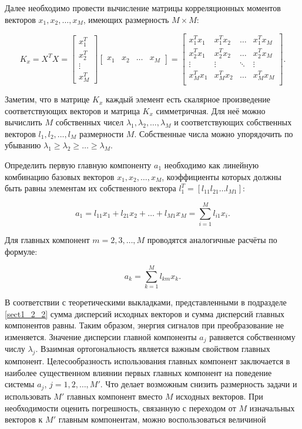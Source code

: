 Далее необходимо провести вычисление матрицы корреляционных моментов векторов $x_1, x_2, \dots, x_M$, имеющих размерность $M \times M$:

\begin{equation} \label{eq:2_3_1_3}
K_x = X^T X =
\begin{bmatrix} x_1^T \\ x_2^T \\ \vdots \\ x_M^T \end{bmatrix} \begin{bmatrix} x_1 & x_2 & \dots & x_M \end{bmatrix} = 
\begin{bmatrix}
x_1^T x_1 & x_1^T x_2 & \dots  & x_1^T x_M \\
x_2^T x_1 & x_2^T x_2 & \dots  & x_2^T x_M \\
\vdots    & \vdots    & \ddots & \vdots    \\
x_M^T x_1 & x_M^T x_2 & \dots  & x_M^T x_M \\
\end{bmatrix}.
\end{equation}

Заметим, что в матрице $K_x$ каждый элемент есть скалярное произведение соответствующих векторов и матрица $K_x$ симметричная.
Для неё можно вычислить $M$ собственных чисел $\lambda_1, \lambda_2, \dots, \lambda_M$ и соответствующих собственных векторов $l_1, l_2, \dots, l_M$ размерности $M$.
Собственные числа можно упорядочить по убыванию $\lambda_1 \ge \lambda_2 \ge \dots \ge \lambda_M$.

Определить первую главную компоненту $a_1$ необходимо как линейную комбинацию базовых векторов $x_1, x_2, \dots, x_M$, коэффициенты которых должны быть равны элементам их собственного вектора $l_1^T= [l_{11} l_{21} \dots l_{M1}]$:

\begin{equation} \label{eq:2_3_1_4}
a_1 = l_{11} x_1 + l_{21} x_2 + \dots + l_{M1} x_M = \sum_{i=1}^M l_{i1} x_i.
\end{equation}

Для главных компонент $m = 2, 3, \dots, M$ проводятся аналогичные расчёты по формуле:

\begin{equation} \label{eq:2_3_1_5}
a_k = \sum_{k=1}^M l_{km} x_k.
\end{equation}

В соответствии с теоретическими выкладками, представленными в подразделе \ref{sect1_2_2} сумма дисперсий исходных векторов и сумма дисперсий главных компонентов равны.
Таким образом, энергия сигналов при преобразование не изменяется.
Значение дисперсии главной компоненты $a_j$ равняется собственному числу $\lambda_j$.
Взаимная ортогональность является важным свойством главных компонент.
Целесообразность использования главных компонент заключается в наиболее существенном влиянии первых главных компонент на поведение системы $a_j$, $j = 1, 2, \dots, M'$.
Что делает возможным снизить размерность задачи и использовать $M'$ главных компонент вместо $M$ исходных векторов.
При необходимости оценить погрешность, связанную с переходом от $M$ изначальных векторов к $M'$ главным компонентам, можно воспользоваться величиной

